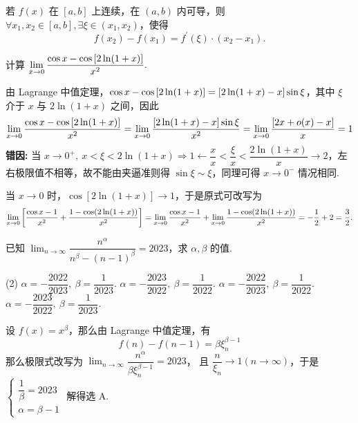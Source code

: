\begin{theorem}
    若 $ f(x) $ 在 $ [a, b] $ 上连续，在 $ (a, b) $ 内可导，则 $ \forall x_{1}, x_{2} \in[a, b], \exists \xi \in\left(x_{1}, x_{2}\right) $，使得
    $$f\left(x_{2}\right)-f\left(x_{1}\right)=f^{\prime}(\xi)\cdot(x_{2}-x_{1}) .$$
\end{theorem}

\begin{example}
    计算 $\displaystyle\lim_{x\to0}\dfrac{\cos x-\cos\qty[2\ln(1+x)]}{x^2}.$
\end{example}
\begin{errorSolution}
    由 Lagrange 中值定理，$\cos x-\cos\qty[2\ln(1+x)]=\qty[2\ln(1+x)-x]\sin\xi$，其中 $\xi$ 介于 $x$ 与 $2\ln(1+x)$ 之间，因此
    $$\lim_{x\to0}\dfrac{\cos x-\cos\qty[2\ln(1+x)]}{x^2}=\lim_{x\to0}\dfrac{\qty[2\ln(1+x)-x]\sin\xi}{x^2}=\lim_{x\to0}\dfrac{\qty[2x+o(x)-x]}{x}=1$$
    \textbf{错因: }当 $x\to0^+,~x<\xi<2\ln(1+x)\Rightarrow 1\gets\dfrac{x}{x}<\dfrac{\xi}{x}<\dfrac{2\ln(1+x)}{x}\to 2$，左右极限值不相等，故不能由夹逼准则得 $\sin\xi\sim\xi$，同理可得 $x\to0^-$ 情况相同.\\
\end{errorSolution}
\begin{solution}
    当 $x\to0$ 时，$\cos [2\ln(1+x)]\to1$，于是原式可改写为 $$\lim_{x\to0}\qty[\dfrac{\cos x-1}{x^2}+\dfrac{1-\cos(2\ln(1+x))}{x^2}]=\lim_{x\to0}\dfrac{\cos x-1}{x^2}+\lim_{x\to0}\dfrac{1-\cos(2\ln(1+x))}{x^2}=-\dfrac{1}{2}+2=\dfrac{3}{2}.$$
\end{solution}

\begin{example}
    已知 $\displaystyle\lim_{n\to\infty}\dfrac{n^{\alpha}}{n^\beta-(n-1)^\beta}=2023$，求 $\alpha,\beta$ 的值.
    \begin{tasks}(2)
        \task $\alpha=-\dfrac{2022}{2023},~\beta=\dfrac{1}{2023}.$
        \task $\alpha=-\dfrac{2023}{2022},~\beta=\dfrac{1}{2022}.$
        \task $\alpha=-\dfrac{2022}{2023},~\beta=\dfrac{1}{2022}.$
        \task $\alpha=-\dfrac{2023}{2022},~\beta=\dfrac{1}{2023}.$
    \end{tasks}
\end{example}
\begin{solution}
    设 $f(x)=x^\beta$，那么由 Lagrange 中值定理，有 $$f(n)-f(n-1)=\beta\xi_n^{\beta-1}$$
    那么极限式改写为 $\displaystyle\lim_{n\to\infty}\dfrac{n^\alpha}{\beta \xi_n^{\beta-1}}=2023$，
    且 $\dfrac{n}{\xi_n}\to1(n\to\infty)$，于是 $\begin{cases}
            \dfrac{1}{\beta}=2023 \\\alpha=\beta-1
        \end{cases}$ 解得选 A.
\end{solution}

